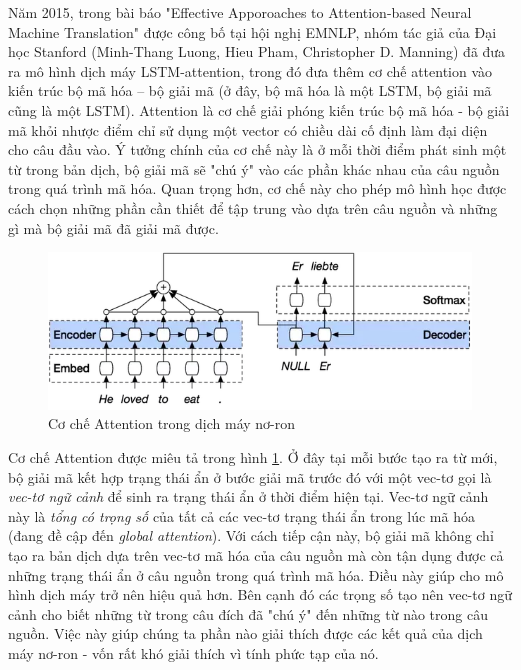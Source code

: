 Năm 2015, trong bài báo "Effective Apporoaches to Attention-based Neural Machine Translation" \cite{attentionThangLuong2015} được công bố tại hội nghị EMNLP, nhóm tác giả của Đại học Stanford (Minh-Thang Luong, Hieu Pham, Christopher D. Manning) đã đưa ra mô hình dịch máy LSTM-attention, trong đó đưa thêm cơ chế attention vào kiến trúc bộ mã hóa – bộ giải mã (ở đây, bộ mã hóa là một LSTM, bộ giải mã cũng là một LSTM). Attention là cơ chế giải phóng kiến trúc bộ mã hóa - bộ giải mã khỏi nhược điểm chỉ sử dụng một vector có chiều dài cố định làm đại diện cho câu đầu vào. Ý tưởng chính của cơ chế này là ở mỗi thời điểm phát sinh một từ trong bản dịch, bộ giải mã sẽ "chú ý" vào các phần khác nhau của câu nguồn trong quá trình mã hóa. Quan trọng hơn, cơ chế này cho phép mô hình học được cách chọn những phần cần thiết để tập trung vào dựa trên câu nguồn và những gì mà bộ giải mã đã giải mã được.

\begin{figure}
	\centering
	\includegraphics[width=\textwidth]{intro2attention}
	\caption[Cơ chế Attention trong dịch máy nơ-ron]{Cơ chế Attention trong dịch máy nơ-ron}
	\label{fig_introattention}
\end{figure}

Cơ chế Attention được miêu tả trong hình \ref{fig_introattention}. Ở đây tại mỗi bước tạo ra từ mới, bộ giải mã kết hợp trạng thái ẩn ở bước giải mã trước đó với một vec-tơ gọi là \textit{vec-tơ ngữ cảnh} để sinh ra trạng thái ẩn ở thời điểm hiện tại. Vec-tơ ngữ cảnh này là \textit{tổng có trọng số} của tất cả các vec-tơ trạng thái ẩn trong lúc mã hóa (đang đề cập đến \textit{global attention}). Với cách tiếp cận này, bộ giải mã không chỉ tạo ra bản dịch dựa trên vec-tơ mã hóa của câu nguồn mà còn tận dụng được cả những trạng thái ẩn ở câu nguồn trong quá trình mã hóa. Điều này giúp cho mô hình dịch máy trở nên hiệu quả hơn. Bên cạnh đó các trọng số tạo nên vec-tơ ngữ cảnh cho biết những từ trong câu đích đã "chú ý" đến những từ nào trong câu nguồn. Việc này giúp chúng ta phần nào giải thích được các kết quả của dịch máy nơ-ron - vốn rất khó giải thích vì tính phức tạp của nó.

